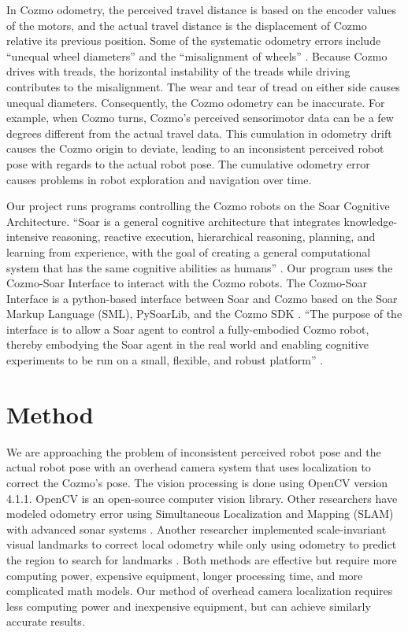 \documentclass[jou,apacite]{apa6}
\begin{document}
In Cozmo odometry, the perceived travel distance is based on the encoder values of the motors, and the actual travel distance is the displacement of Cozmo relative its previous position. Some of the systematic odometry errors include “unequal wheel diameters” and the “misalignment of wheels” \cite{Borenstein}. Because Cozmo drives with treads, the horizontal instability of the treads while driving contributes to the misalignment. The wear and tear of tread on either side causes unequal diameters. Consequently, the Cozmo odometry can be inaccurate. For example, when Cozmo turns, Cozmo’s perceived sensorimotor data can be a few degrees different from the actual travel data. This cumulation in odometry drift causes the Cozmo origin to deviate, leading to an inconsistent perceived robot pose with regards to the actual robot pose. The cumulative odometry error causes problems in robot exploration and navigation over time.

Our project runs programs controlling the Cozmo robots on the Soar Cognitive Architecture. “Soar is a general cognitive architecture that integrates knowledge-intensive reasoning, reactive execution, hierarchical reasoning, planning, and learning from experience, with the goal of creating a general computational system that has the same cognitive abilities as humans” 
\cite{Laird}. Our program uses the Cozmo-Soar Interface to interact with the Cozmo robots. The Cozmo-Soar Interface is a python-based interface between Soar and Cozmo based on the Soar Markup Language (SML), PySoarLib, and the Cozmo SDK \cite{Mininger}. “The purpose of the interface is to allow a Soar agent to control a fully-embodied Cozmo robot, thereby embodying the Soar agent in the real world and enabling cognitive experiments to be run on a small, flexible, and robust platform” \cite{Boggs}.


\section{Method}
We are approaching the problem of inconsistent perceived robot pose and the actual robot pose with an overhead camera system that uses localization to correct the Cozmo's pose. The vision processing is done using OpenCV version 4.1.1. OpenCV is an open-source computer vision library. Other researchers have modeled odometry error using Simultaneous Localization and Mapping (SLAM) with advanced sonar systems \cite{Kleeman}. Another researcher implemented scale-invariant visual landmarks to correct local odometry while only using odometry to predict the region to search for landmarks \cite{se}. Both methods are effective but require more computing power, expensive equipment, longer processing time, and more complicated math models. Our method of overhead camera localization requires less computing power and inexpensive equipment, but can achieve similarly accurate results.
\end{document}
